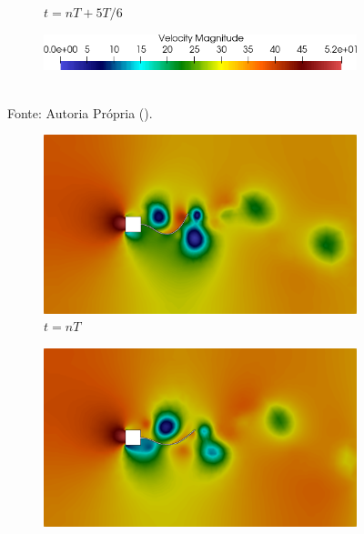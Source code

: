 \begin{figure}[h!]
\begin{subfigure}[b]{0.49\textwidth}
        \caption{$t=nT+5T/6$}
    \end{subfigure}
    \begin{subfigure}[b]{0.49\textwidth}
        \includegraphics[width=\linewidth]{Figuras/FSI-prism/legendav.png}
    \end{subfigure}
    \\Fonte: Autoria Própria (\the\year).
    \label{fig:prismVel}
\end{figure}

\begin{figure}[h!]
    \centering
    \caption{\textit{Flutter} em painel - Caso 1 - Campo de pressões obtidos no problema de \textit{Flutter} em painel.}
    \begin{subfigure}[b]{0.49\textwidth}
        \includegraphics[width=\linewidth]{Figuras/FSI-prism/pT1.png}
        \caption{$t=nT$}
    \end{subfigure}
    \begin{subfigure}[b]{0.49\textwidth}
        \includegraphics[width=\linewidth]{Figuras/FSI-prism/pT2.png}

\end{subfigure}
\end{figure}
